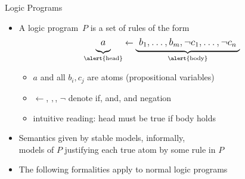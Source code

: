 \begin{frame}{  Logic Programs}
  \begin{itemize}
  \item<2->
    A \alert{logic program}~$P$ is a \alert{set of rules} of the form
    \[\large
    \underbrace{a\raisebox{-4pt}{}}_{\text{\alert{head}}}\leftarrow\underbrace{\raisebox{-4pt}{\ }b_1,\dots,b_m,\neg{c_1},\dots,\neg{c_n}\raisebox{-4pt}{\ }}_{\alert{\text{body}}}
    \]
    \begin{itemize}
    \item $a$ and all $b_i,c_j$ are \alert{atoms} (propositional variables)
    \item \alert{$\leftarrow$}, \alert{$,$}, \alert{$\neg$} denote \alert{if}, \alert{and}, and \alert{negation}
    \item intuitive reading: \alert{head} must be true \alert{if body} holds
    \end{itemize}
    \medskip
  \item<3->
    Semantics given by \alert{stable models}, informally,\\
    models of $P$ justifying each true atom by some rule in $P$
    \bigskip
  \item<only@4>  The following formalities apply to normal logic programs
  \end{itemize}
\end{frame}
%
